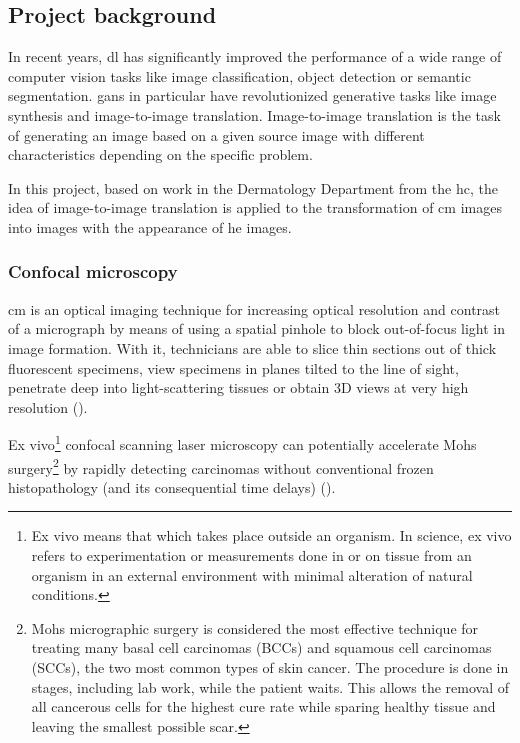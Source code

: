 \documentclass[../main.tex]{subfiles}
\begin{document}
\subsection{Project background}
\label{sec:project-background}

In recent years, \gls{dl} has significantly improved the
performance of a wide range of computer vision tasks like image classification,
object detection or semantic segmentation.
\gls{gans} in particular have revolutionized generative tasks like image synthesis
and image-to-image translation.
Image-to-image translation is the task of generating an image based on a
given source image with different characteristics depending on the specific problem.

In this project, based on \parencite{Combalia2019} work in the Dermatology
Department from the \gls{hc},
the idea of image-to-image translation
is applied to the transformation of \gls{cm} images into images with the
appearance of \gls{he} images.

\subsubsection{Confocal microscopy}
\gls{cm} is an optical imaging technique for increasing optical resolution
and contrast of a micrograph by means of using a spatial pinhole to block
out-of-focus light in image formation. With it, technicians are able to slice
thin sections out of thick fluorescent specimens, view specimens
in planes tilted to the line of sight, penetrate deep into light-scattering
tissues or obtain 3D views at very high resolution (\cite{Inoue2006}).

Ex vivo\footnote{Ex vivo means that which takes place outside an organism.
In science, ex vivo refers to experimentation or measurements done in or on
tissue from an organism in an external environment with minimal alteration
of natural conditions.} confocal scanning laser microscopy can potentially
accelerate Mohs surgery\footnote{Mohs micrographic surgery is considered the
most effective technique for treating many basal cell carcinomas (BCCs) and
squamous cell carcinomas (SCCs), the two most common types of skin cancer.
The procedure is done in stages, including lab work, while the patient waits.
This allows the removal of all cancerous cells for the highest cure rate
while sparing healthy tissue and leaving the smallest possible scar.}
by rapidly detecting carcinomas without conventional frozen histopathology
(and its consequential time delays) (\cite{Chung2005}).
\end{document}
